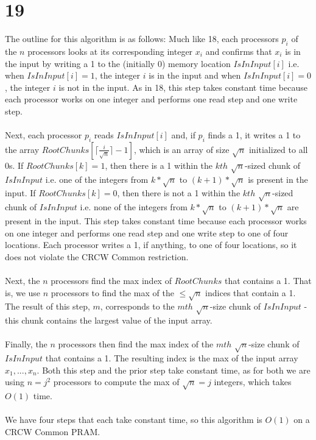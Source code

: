 \documentclass[letterpaper,notitlepage,twoside]{article}
\begin{document}
\section*{19}
The outline for this algorithm is as follows: Much like 18, each processors $p_i$ of the $n$ processors looks at its corresponding integer $x_i$ and confirms that $x_i$ is in the input by writing a 1 to the (initially 0) memory location $IsInInput[i]$ i.e. when $IsInInput[i] = 1$, the integer $i$ is in the input and when $IsInInput[i] = 0$, the integer $i$ is not in the input. As in 18, this step takes constant time because each processor works on one integer and performs one read step and one write step. \\\\
Next, each processor $p_i$ reads $IsInInput[i]$ and, if $p_i$ finds a 1, it writes a 1 to the array $RootChunks[\lceil \frac{i}{\sqrt{n}} \rceil -1]$, which is an array of size $\sqrt{n}$ initialized to all 0s. If $RootChunks[k] = 1$, then there is a 1 within the $kth$ $\sqrt{n}$-sized chunk of $IsInInput$ i.e. one of the integers from $k*\sqrt{n}$ to $(k+1)*\sqrt{n}$ is present in the input. If $RootChunks[k] = 0$, then there is not a 1 within the $kth$ $\sqrt{n}$-sized chunk of $IsInInput$ i.e. none of the integers from $k*\sqrt{n}$ to $(k+1)*\sqrt{n}$ are present in the input. This step takes constant time because each processor works on one integer and performs one read step and one write step to one of four locations. Each processor writes a 1, if anything, to one of four locations, so it does not violate the CRCW Common restriction. \\\\
Next, the $n$ processors find the max index of $RootChunks$ that contains a 1. That is, we use $n$ processors to find the max of the $\leq \sqrt{n}$ indices that contain a 1. The result of this step, $m$, corresponds to the $mth$ $\sqrt{n}$-size chunk of $IsInInput$ - this chunk contains the largest value of the input array. \\\\
Finally, the $n$ processors then find the max index of the $mth$ $\sqrt{n}$-size chunk of $IsInInput$ that contains a 1. The resulting index is the max of the input array $x_1, ..., x_n$. Both this step and the prior step take constant time, as for both we are using $n = j^{2}$ processors to compute the max of $\sqrt{n} = j$ integers, which takes $O(1)$ time. \\\\
We have four steps that each take constant time, so this algorithm is $O(1)$ on a CRCW Common PRAM.
\end{document}
